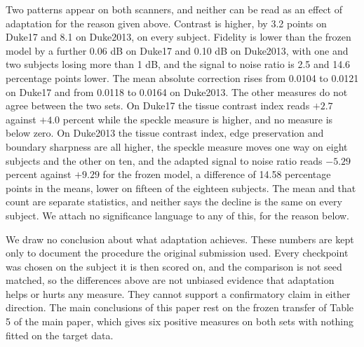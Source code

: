 Two patterns appear on both scanners, and neither can be read as an effect of adaptation for the
reason given above. Contrast is higher, by 3.2 points on Duke17 and 8.1 on Duke2013, on every
subject. Fidelity is lower than the frozen model by a
further 0.06 dB on Duke17 and 0.10 dB on Duke2013, with one and two subjects losing more than 1 dB,
and the signal to noise ratio is 2.5 and 14.6 percentage points lower. The mean absolute correction rises from
0.0104 to 0.0121 on Duke17 and from 0.0118 to 0.0164 on Duke2013. The other measures do not agree
between the two sets. On Duke17 the tissue contrast index reads $+2.7$ against $+4.0$ percent
while the speckle measure is higher, and no measure is below zero. On Duke2013 the tissue contrast
index, edge preservation and boundary sharpness are all higher, the speckle measure moves one way on
eight subjects and the other on ten, and the adapted signal to noise ratio reads $-5.29$ percent
against $+9.29$ for the frozen model, a difference of 14.58 percentage points in the means, lower on
fifteen of the eighteen subjects. The mean and that count are separate statistics, and neither says
the decline is the same on every subject. We attach no significance language to any of this, for the
reason below.

We draw no conclusion about what adaptation achieves. These numbers are kept only to document the
procedure the original submission used. Every checkpoint was chosen on the subject it is then scored
on, and the comparison is not seed matched, so the differences above are not
unbiased evidence that adaptation helps or hurts any measure. They cannot support a confirmatory
claim in either direction. The main conclusions of this paper rest on the frozen transfer of Table 5
of the main paper, which gives six positive measures on both sets with nothing fitted on the target
data.
